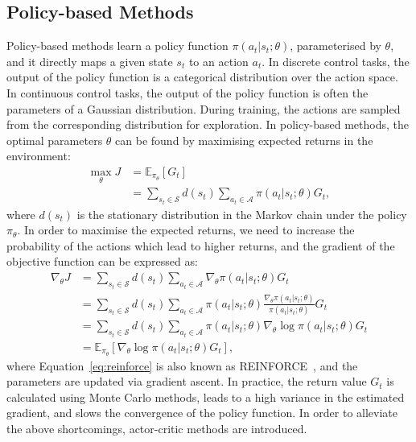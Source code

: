 \subsection{Policy-based Methods}
\label{ch3:policy-based}
Policy-based methods learn a policy function $\pi(a_{t}|s_{t};{\theta})$, parameterised by $\theta$, and it directly maps a given state $s_{t}$ to an action $a_{t}$. In discrete control tasks, the output of the policy function is a categorical distribution over the action space. In continuous control tasks, the output of the policy function is often the parameters of a Gaussian distribution. During training, the actions are sampled from the corresponding distribution for exploration. In policy-based methods, the optimal parameters $\theta$ can be found by maximising expected returns in the environment:
\begin{align}
    \max_{\theta}J & = \mathbb{E}_{\pi_{\theta}}[G_{t}] \\
                   & = \sum_{s_{t}\in\mathcal{S}}d(s_{t})\sum_{a_{t}\in\mathcal{A}}\pi(a_{t}|s_{t};\theta)G_{t},
\end{align}
where $d(s_{t})$ is the stationary distribution in the Markov chain under the policy $\pi_{\theta}$. In order to maximise the expected returns, we need to increase the probability of the actions which lead to higher returns, and the gradient of the objective function can be expressed as:
\begin{align}
    \nabla_{\theta} J &= \sum_{s_{t}\in\mathcal{S}}d(s_{t})\sum_{a_{t}\in\mathcal{A}}\nabla_{\theta}\pi(a_{t}|s_{t};\theta)G_{t} \\
    &= \sum_{s_{t}\in\mathcal{S}}d(s_{t})\sum_{a_{t}\in\mathcal{A}}\pi(a_{t}|s_{t};\theta)\frac{\nabla_{\theta}\pi(a_{t}|s_{t};\theta)}{\pi(a_{t}|s_{t};\theta)}G_{t}\\
    &= \sum_{s_{t}\in\mathcal{S}}d(s_{t})\sum_{a_{t}\in\mathcal{A}}\pi(a_{t}|s_{t};\theta)\nabla_{\theta}\log\pi(a_{t}|s_{t};\theta)G_{t} \\
    &=\mathbb{E}_{\pi_{\theta}}[\nabla_{\theta}\log\pi(a_{t}|s_{t};\theta)G_{t}], \label{eq:reinforce}
\end{align}
where Equation~\eqref{eq:reinforce} is also known as REINFORCE~\cite{williams1992simple}, and the parameters are updated via gradient ascent. In practice, the return value $G_{t}$ is calculated using Monte Carlo methods, leads to a high variance in the estimated gradient, and slows the convergence of the policy function. In order to alleviate the above shortcomings, actor-critic methods are introduced. 

